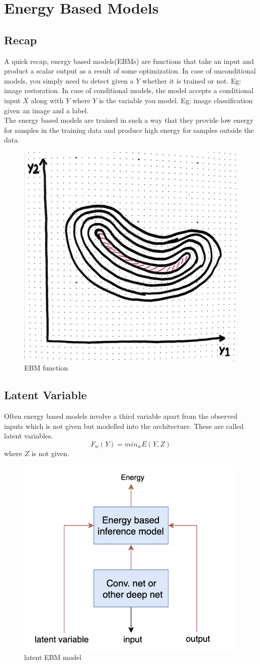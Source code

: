 \chapter{Energy Based Models}

\section{Recap}

A quick recap, energy based models(EBMs) are functions that take an input and product a scalar output as a result of some optimization.
In case of unconditional models, you simply need to detect given a $Y$ whether it is trained or not. Eg: image restoration.
In case of conditional models, the model accepts a conditional input $X$ along with $Y$ where $Y$ is the variable you model. Eg: image classification given an image and a label.\\

The energy based models are trained in such a way that they provide low energy for samples in the training data and produce high energy for samples outside the data.
\begin{figure}[!h]
    \centering
    \includegraphics[width=0.4\linewidth]{lectures/08-a/images/EBM_function.png}
    \caption{EBM function}
    \label{fig:EBM_function}
\end{figure}
\section{Latent Variable}
Often energy based models involve a third variable apart from the observed inputs which is not given but modelled into the architecture. These are called latent variables.
\begin{equation}
    F_{w}(Y) = min_{w} E(Y, Z)
\end{equation}
where $Z$ is not given.
\begin{figure}[!h]
    \centering
    \includegraphics[width=0.4\linewidth]{lectures/08-a/images/latent_EBM_architecture.png}
    \caption{latent EBM model}
    \label{fig:latent_EBM_model}
\end{figure}

